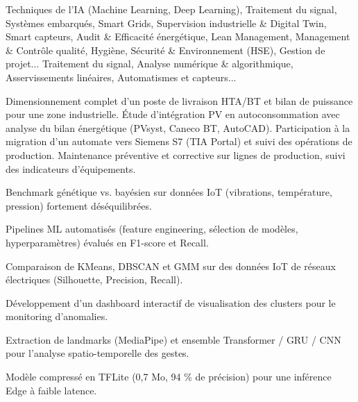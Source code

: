 \documentclass[10pt,a4paper]{../altacv}
\begin{document}
\cvidentite
{}
\makecvheader

\cvformation
{Techniques de l’IA (Machine Learning, Deep Learning), Traitement du signal, Systèmes embarqués, Smart Grids, Supervision industrielle \& Digital Twin, Smart capteurs, Audit \& Efficacité énergétique, Lean Management, Management \& Contrôle qualité, Hygiène, Sécurité \& Environnement (HSE), Gestion de projet...}
{Traitement du signal, Analyse numérique \& algorithmique, Asservissements linéaires, Automatismes et capteurs...}

\expcore
{Dimensionnement complet d’un poste de livraison HTA/BT et bilan de puissance pour une zone industrielle.}
{Étude d’intégration PV en autoconsommation avec analyse du bilan énergétique (PVsyst, Caneco BT, AutoCAD).}
\vspace{2pt}
\expmenara
{Participation à la migration d’un automate vers Siemens S7 (TIA Portal) et suivi des opérations de production.}
{Maintenance préventive et corrective sur lignes de production, suivi des indicateurs d’équipements.}

\begin{cvitems}
  \item Benchmark génétique vs. bayésien sur données IoT (vibrations, température, pression) fortement déséquilibrées.
  \item Pipelines ML automatisés (feature engineering, sélection de modèles, hyperparamètres) évalués en F1-score et Recall.
\end{cvitems}
\vspace{2pt}
\begin{cvitems}
  \item Comparaison de KMeans, DBSCAN et GMM sur des données IoT de réseaux électriques (Silhouette, Precision, Recall).
  \item Développement d’un dashboard interactif de visualisation des clusters pour le monitoring d’anomalies.
\end{cvitems}
\vspace{2pt}
\begin{cvitems}
  \item Extraction de landmarks (MediaPipe) et ensemble Transformer / GRU / CNN pour l’analyse spatio-temporelle des gestes.
  \item Modèle compressé en TFLite (0,7 Mo, 94 \% de précision) pour une inférence Edge à faible latence.
\end{cvitems}
\end{document}
